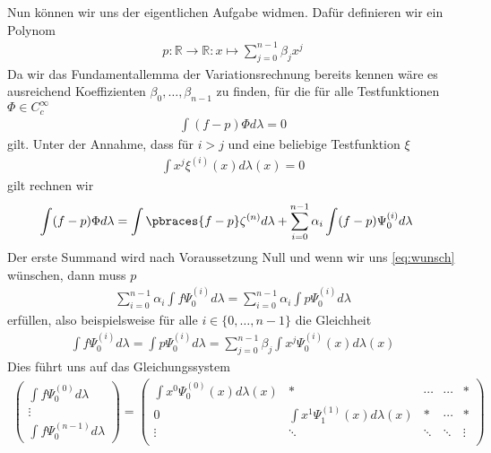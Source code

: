 \begin{solution}
    Nun können wir uns der eigentlichen Aufgabe widmen. Dafür definieren wir ein Polynom 
    \begin{align*}
        p:\mathbb{R}\to\mathbb{R}:x\mapsto\sum_{j=0}^{n-1}\beta_jx^j
    \end{align*}
    Da wir das Fundamentallemma der Variationsrechnung bereits kennen wäre es ausreichend Koeffizienten $\beta_0,\dots,\beta_{n-1}$ zu finden, für die für alle Testfunktionen $\Phi\in C_c^\infty$
    \begin{align}
        \int (f-p)\Phi d\lambda=0\label{eq:wunsch}
    \end{align}
    gilt. Unter der Annahme, dass für $i>j$ und eine beliebige Testfunktion $\xi$
    \begin{align*}
        \int x^j\xi^{(i)}(x)d\lambda(x) = 0
    \end{align*}
    gilt rechnen wir
    \begin{align*}
        \int (f-p)\Phi d\lambda&=\int\pbraces{f-p}\zeta^{(n)}d\lambda+\sum_{i=0}^{n-1}\alpha_i\int(f-p)\Psi_0^{(i)}d\lambda
    \end{align*}
    Der erste Summand wird nach Voraussetzung Null und wenn wir uns \eqref{eq:wunsch} wünschen, dann muss $p$
    \begin{align*}
        \sum_{i=0}^{n-1}\alpha_i\int f\Psi_0^{(i)}d\lambda=\sum_{i=0}^{n-1}\alpha_i\int p\Psi_0^{(i)}d\lambda
    \end{align*}
    erfüllen, also beispielsweise für alle $i\in\{0,\dots,n-1\}$ die Gleichheit
    \begin{align*}
        \int f\Psi_0^{(i)}d\lambda=\int p\Psi_0^{(i)}d\lambda=\sum_{j=0}^{n-1}\beta_j\int x^j\Psi_0^{(i)}(x)d\lambda(x)
    \end{align*} 
    Dies führt uns auf das Gleichungssystem
    \begin{align*}
        \begin{pmatrix}
            \int f\Psi_0^{(0)}d\lambda\\
            \vdots\\
            \int f\Psi_0^{(n-1)}d\lambda
        \end{pmatrix} 
        =
        \begin{pmatrix}
            \int x^0\Psi_0^{(0)}(x)d\lambda(x) & * & \cdots & \cdots & * \\
            0 & \int x^1\Psi_1^{(1)}(x)d\lambda(x) & * & \cdots & * \\
            \vdots & \ddots & \ddots & \ddots &\vdots \\

\end{pmatrix}
\end{align*}
\end{solution}
